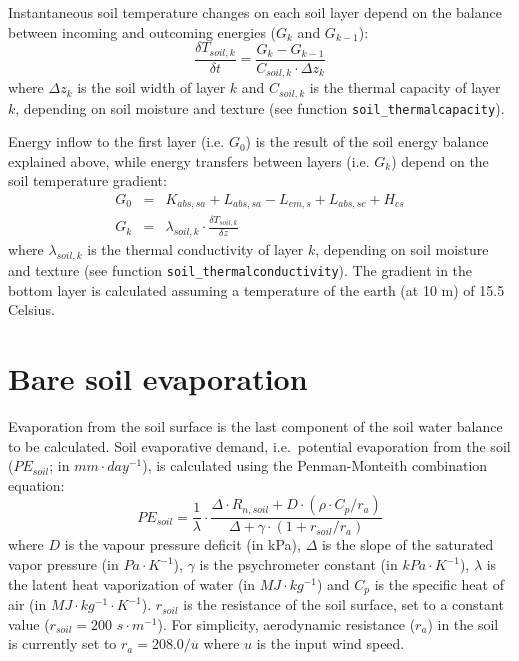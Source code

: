 \documentclass[]{book}
\begin{document}
Instantaneous soil temperature changes on each soil layer depend on the balance between incoming and outcoming energies (\(G_k\) and \(G_{k-1}\)):
\begin{equation}
\frac{\delta T_{soil,k}}{\delta t} = \frac{G_k - G_{k-1}}{C_{soil,k} \cdot \Delta z_k}
\end{equation}
where \(\Delta z_k\) is the soil width of layer \(k\) and \(C_{soil,k}\) is the thermal capacity of layer \(k\), depending on soil moisture and texture (see function \texttt{soil\_thermalcapacity}).

Energy inflow to the first layer (i.e. \(G_0\)) is the result of the soil energy balance explained above, while energy transfers between layers (i.e. \(G_k\)) depend on the soil temperature gradient:
\begin{eqnarray}
G_0 &=& K_{abs,sa} + L_{abs,sa} - L_{em,s} + L_{abs,sc} + H_{cs}\\
G_k &=& \lambda_{soil,k} \cdot \frac{\delta T_{soil,k}}{\delta z}
\end{eqnarray}
where \(\lambda_{soil,k}\) is the thermal conductivity of layer \(k\), depending on soil moisture and texture (see function \texttt{soil\_thermalconductivity}). The gradient in the bottom layer is calculated assuming a temperature of the earth (at 10 m) of 15.5 Celsius.

\hypertarget{bare-soil-evaporation}{%
\section{Bare soil evaporation}\label{bare-soil-evaporation}}

Evaporation from the soil surface is the last component of the soil water balance to be calculated. Soil evaporative demand, i.e.~potential evaporation from the soil (\(PE_{soil}\); in \(mm\cdot day^{-1}\)), is calculated using the Penman-Monteith combination equation:
\begin{equation}
PE_{soil} = \frac{1}{\lambda} \cdot \frac{\Delta \cdot R_{n,soil} + D \cdot (\rho \cdot C_p/r_a)}{\Delta + \gamma \cdot (1 + r_{soil}/r_a)}
\end{equation}
where \(D\) is the vapour pressure deficit (in kPa), \(\Delta\) is the slope of the saturated vapor pressure (in \(Pa \cdot K^{-1}\)), \(\gamma\) is the psychrometer constant (in \(kPa\cdot K^{-1}\)), \(\lambda\) is the latent heat vaporization of water (in \(MJ\cdot kg^{-1}\)) and \(C_p\) is the specific heat of air (in \(MJ\cdot kg^{-1}\cdot K^{-1}\)). \(r_{soil}\) is the resistance of the soil surface, set to a constant value (\(r_{soil} = 200\) \(s\cdot m^{-1}\)). For simplicity, aerodynamic resistance (\(r_a\)) in the soil is currently set to \(r_a = 208.0/u\) where \(u\) is the input wind speed.
\end{document}
